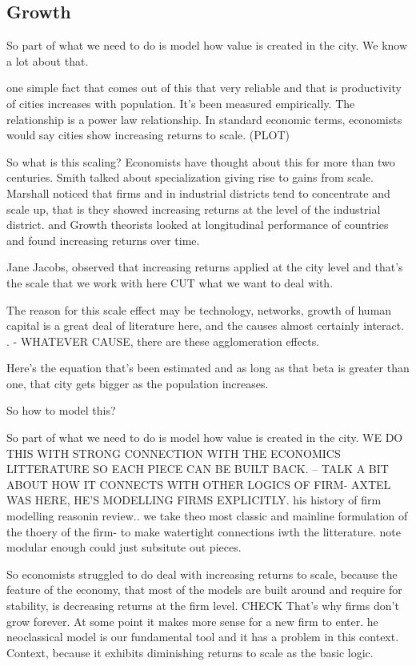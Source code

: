 \subsection{Growth}
So part of what we need to do is model how value is created in the city. 
We know a lot about that. 

one simple fact that comes out of this that very reliable and that is 
productivity of cities increases with population. It's been measured empirically. The relationship is a power law relationship.
In  standard economic terms, economists would say cities show increasing returns to scale. (PLOT)

So what is this  scaling?
Economists have thought about this for more than two centuries. Smith talked about specialization giving rise to gains from scale. 
Marshall noticed that firms and in industrial districts tend to concentrate and scale up, that is they showed increasing returns at the level of the industrial district. 
and Growth theorists looked at longitudinal performance of countries and found increasing returns over time.

Jane Jacobs, observed that increasing returns applied at the city level and that's the scale that we work with here CUT what we want to deal with.

The reason for this scale effect may be technology, networks, growth of human capital is a great deal of literature here, and the causes almost certainly interact. . - WHATEVER CAUSE, there are these agglomeration effects. 

Here's the equation that's been estimated and as long as that beta is greater than one, that city gets bigger as the population increases.

So how to model this?

So part of what we need to do is model how value is created in the city. 
WE DO THIS WITH STRONG CONNECTION WITH THE ECONOMICS LITTERATURE SO EACH PIECE CAN BE BUILT BACK. -- 
TALK A BIT ABOUT HOW IT CONNECTS WITH OTHER LOGICS OF FIRM- AXTEL WAS HERE, HE'S MODELLING FIRMS EXPLICITLY. 
his history of firm modelling reasonin review..
we take theo most classic and mainline formulation of the thoery of the firm- to make watertight connections iwth the litterature. note modular enough could just subsitute out pieces. 

So economists struggled to do deal with increasing returns to scale, because the feature of the economy, that most of the models are built around and require for stability, is decreasing returns at the firm level. CHECK That's why firms don't grow forever.  At some point it makes more sense for a new firm to enter.
he neoclassical model is our fundamental tool and it has a problem in this context. Context, because it exhibits diminishing returns to scale as the basic logic.

